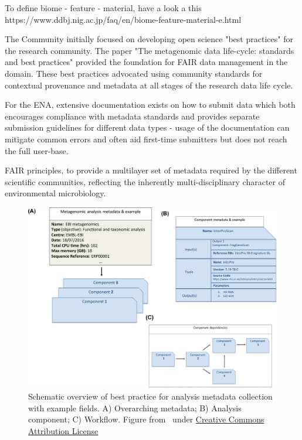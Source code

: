       \cite{stevens2000ontology}



      To define biome - feature - material, have a look a this
      https://www.ddbj.nig.ac.jp/faq/en/biome-feature-material-e.html

      \fi



      The Community initially focused on developing open science "best practices" for the research community. 
      The paper "The metagenomic data life-cycle: standards and best practices" \citep{ten2017metagenomic} provided the foundation for FAIR data management in the domain. 
      These best practices advocated using community standards for contextual provenance and metadata at all stages of the research data life cycle.



      For the ENA, extensive documentation exists on how to submit data which both encourages compliance with metadata standards and provides separate submission guidelines for different data types - usage of the documentation can mitigate common errors and often aid first-time submitters but does not reach the full user-base. 

      FAIR principles, to provide a multilayer set of metadata required by the different scientific communities, reflecting the inherently multi-disciplinary character of environmental microbiology. 


      \begin{figure}[!h]
         \centering
         \includegraphics[width=.95\textwidth]{figures/metadata_Scheme.jpeg}
         \caption[Metadata collection for metagenomic data]{
            Schematic overview of best practice for analysis metadata collection with example fields. 
            A) Overarching metadata; 
            B) Analysis component; 
            C) Workflow. 
            Figure from~\cite{ten2017metagenomic} under 
            \href{http://creativecommons.org/licenses/by/4.0/}{Creative Commons Attribution License}
            }
         \label{fig:metadata}
      \end{figure}
      \fi



